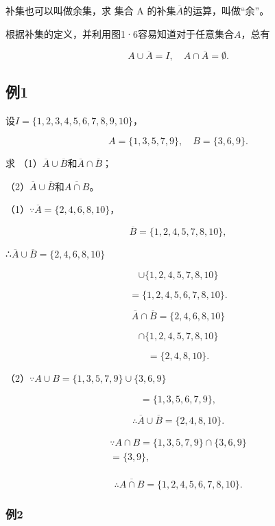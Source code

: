 补集也可以叫做余集，求 集合 A 的补集\(\overline{A}\)的运算，叫做``余''。

根据补集的定义，并利用图1·6容易知道对于任意集合\(A\)，总有

\[
A \cup \overline {{{A}}} = I, \quad A \cap \overline {{{A}}} = \emptyset.
\]

\subsection{例1}

设\(I = \{1, 2, 3, 4, 5, 6, 7, 8, 9, 10\}\)，

\[
A = \{1, 3, 5, 7, 9 \}, \quad B = \{3, 6, 9 \}.
\]

求
（1）\(\overline{A} \cup \overline{B}\)和\(\overline{A} \cap \overline{B}\)；

（2）\(\overline{A} \cup \overline{B}\)和\(\overline{A \cap B}\)。

 （1）\(\because \overline{A} = \{2, 4, 6, 8, 10\}\)，

\[
\overline {{{B}}} = \{1, 2, 4, 5, 7, 8, 10 \},
\]

∴\(\overline{A} \cup \overline{B} = \{2, 4, 6, 8, 10\}\)

\[
\cup \{1, 2, 4, 5, 7, 8, 10 \}
\]

\[
= \{1, 2, 4, 5, 6, 7, 8, 10 \}.
\]

\[
\overline {{{A}}} \cap \overline {{{B}}} = \{2, 4, 6, 8, 10 \}
\]

\[
\cap \{1, 2, 4, 5, 7, 8, 10 \}
\]

\[
= \{2, 4, 8, 10 \}.
\]

（2）\(\because A \cup B = \{1, 3, 5, 7, 9\} \cup \{3, 6, 9\}\)

\[
= \{1, 3, 5, 6, 7, 9 \},
\]

\[
\therefore \overline {{A}} \cup \overline {{B}} = \{2, 4, 8, 10 \}.
\]

\[
\begin{array}{l} \because A \cap B = \{1, 3, 5, 7, 9 \} \cap \{3, 6, 9 \} \\ = \{3, 9 \}, \\ \end{array}
\]

\[
\therefore \overline {{A \cap B}} = \{1, 2, 4, 5, 6, 7, 8, 10 \}.
\]

\subsubsection{例2}

